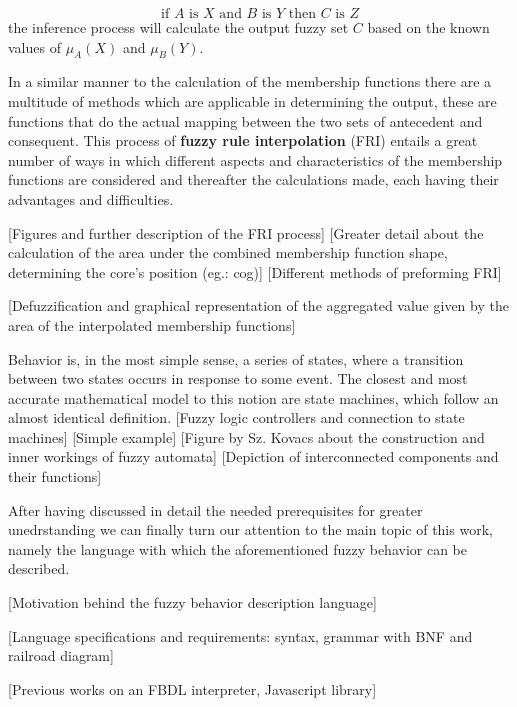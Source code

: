\[
	\text{if } A \text{ is } X \text{ and } B \text{ is } Y \text{ then } C \text{ is } Z
\]
the inference process will calculate the output fuzzy set $C$ based on the known values of $\mu_A(X)$ and $\mu_B(Y)$.

In a similar manner to the calculation of the membership functions there are a multitude of methods which are applicable in determining the output, these are functions that do the actual mapping between the two sets of antecedent and consequent. This process of \textbf{fuzzy rule interpolation} (FRI) entails a great number of ways in which different aspects and characteristics of the membership functions are considered and thereafter the calculations made, each having their advantages and difficulties.

[Figures and further description of the FRI process]
[Greater detail about the calculation of the area under the combined membership function shape, determining the core's position (eg.: cog)]
[Different methods of preforming FRI]

[Defuzzification and graphical representation of the aggregated value given by the area of the interpolated membership functions]

Behavior is, in the most simple sense, a series of states, where a transition between two states occurs in response to some event. The closest and most accurate mathematical model to this notion are state machines, which follow an almost identical definition. 
[Fuzzy logic controllers and connection to state machines]
[Simple example]
[Figure by Sz. Kovacs about the construction and inner workings of fuzzy automata]
[Depiction of interconnected components and their functions]

After having discussed in detail the needed prerequisites for greater unedrstanding we can finally turn our attention to the main topic of this work, namely the language with which the aforementioned fuzzy behavior can be described. 


[Motivation behind the fuzzy behavior description language]

[Language specifications and requirements: syntax, grammar with BNF and railroad diagram]

[Previous works on an FBDL interpreter, Javascript library]
